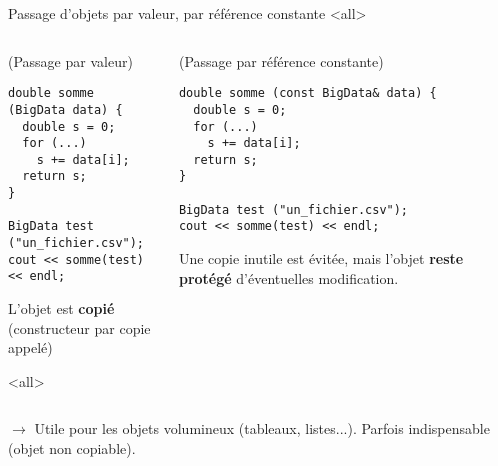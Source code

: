 \documentclass[c]{beamer}
\begin{document}

\begin{frame}[fragile]{Passage d'objets par valeur, par référence constante}
 \onslide<all>
\begin{columns}
\begin{column}{0.5\columnwidth}
\begin{cbox}[][lwuc][\footnotesize](Passage par valeur)
\begin{verbatim}
double somme (BigData data) {
  double s = 0;
  for (...)
    s += data[i];
  return s;
}

BigData test ("un_fichier.csv");
cout << somme(test) << endl;
\end{verbatim}

\begin{cbox}[][][\centering]
L'objet est \textbf{copié}\\(constructeur par copie appelé)
\end{cbox}
\vspace{0em}

\onslide<all>
\end{cbox}
\end{column}
\begin{column}{0.5\columnwidth}
\begin{cbox}[][lwuc][\footnotesize](Passage par référence constante)
\begin{verbatim}
double somme (const BigData& data) {
  double s = 0;
  for (...)
    s += data[i];
  return s;
}

BigData test ("un_fichier.csv");
cout << somme(test) << endl;
\end{verbatim}
\vspace{-1.6em}
\begin{cbox}[][][\centering]
Une copie inutile est évitée, mais l'objet \textbf{reste protégé} d'éventuelles modification.
\end{cbox}
\end{cbox}
\end{column}
\end{columns}

\vspace{1em}
\pause
$\rightarrow$ Utile pour les objets volumineux (tableaux, listes...). Parfois indispensable (objet non copiable).

\end{frame}
\end{document}
